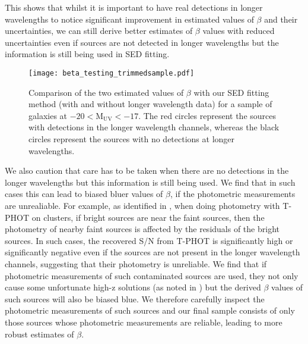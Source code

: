 \documentclass[twocolumn]{aastex63}
\begin{document}
This shows that whilst it is important to have real detections in longer wavelengths to notice significant improvement in estimated values of $\beta$ and their uncertainties, we can still derive better estimates of $\beta$ values with reduced uncertainties even if sources are not detected in longer wavelengths but the information is still being used in SED fitting.

\begin{figure}
\texttt{[image: beta\_testing\_trimmedsample.pdf]}
\caption{Comparison of the two estimated values of $\beta$ with our SED fitting method (with and without longer wavelength data) for a sample of galaxies at $-20<\mathrm{M_{UV}<-17}$. The red circles represent the sources with detections in the longer wavelength channels, whereas the black circles represent the sources with no detections at longer wavelengths.}
\label{fig:beta_comp}
\end{figure}

We also caution that care has to be taken when there are no detections in the longer wavelengths but this information is still being used. We find that in such cases this can lead to biased bluer values of $\beta$, if the photometric measurements are unrealiable. For example, as identified in \citet{Bhatawdekar2019}, when doing photometry with T-PHOT on clusters, if bright sources are near the faint sources, then the photometry of nearby faint sources is affected by the residuals of the bright sources. In such cases, the recovered S/N from T-PHOT is significantly high or significantly negative even if the sources are not present in the longer wavelength channels, suggesting that their photometry is unreliable. We find that if photometric measurements of such contaminated sources are used,  they not only cause some unfortunate high-z solutions (as noted in \citet{Bhatawdekar2019}) but the derived $\beta$ values of such sources will also be biased blue. We therefore carefully inspect the photometric measurements of such sources and our final sample consists of only those sources whose photometric measurements are reliable, leading to more robust estimates of $\beta$.
\end{document}
